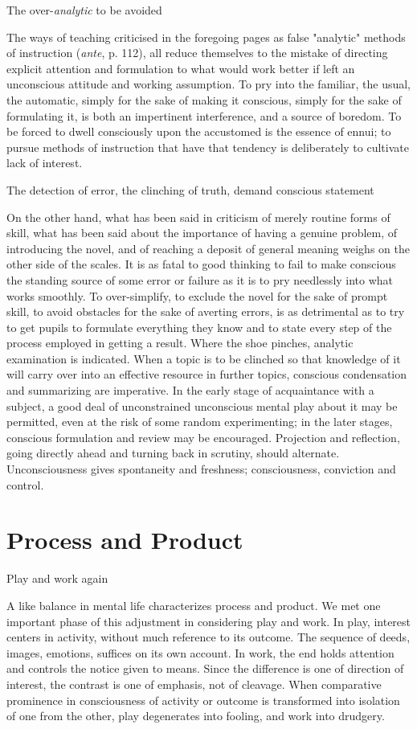 \documentclass[letterpaper]{book}
\begin{document}
The over-\emph{analytic} to be avoided

The ways of teaching criticised in the foregoing pages as false
"analytic" methods of instruction (\emph{ante}, p. 112), all reduce
themselves to the mistake of directing explicit attention and
formulation to what would work better if left an unconscious attitude
and working assumption. To pry into the familiar, the usual, the
automatic, simply for the sake of making it conscious, simply for the
sake of formulating it, is both an impertinent interference, and a
source of boredom. To be forced to dwell consciously upon the accustomed
is the essence of ennui; to pursue methods of instruction that have that
tendency is deliberately to cultivate lack of interest.

The detection of error, the clinching of truth, demand conscious
statement

On the other hand, what has been said in criticism of merely routine
forms of skill, what has been said about the importance of having a
genuine problem, of introducing the novel, and of reaching a deposit of
general meaning weighs on the other side of the scales. It is as fatal
to good thinking to fail to make conscious the standing source of some
error or failure as it is to pry needlessly into what works smoothly. To
over-simplify, to exclude the novel for the sake of prompt skill, to
avoid obstacles for the sake of averting errors, is as detrimental as to
try to get pupils to formulate everything they know and to state every
step of the process employed in getting a result. Where the shoe
pinches, analytic examination is indicated. When a topic is to be
clinched so that knowledge of it will carry over into an effective
resource in further topics, conscious condensation and summarizing are
imperative. In the early stage of acquaintance with a subject, a good
deal of unconstrained unconscious mental play about it may
be
permitted, even at the risk of some random experimenting; in the later
stages, conscious formulation and review may be encouraged. Projection
and reflection, going directly ahead and turning back in scrutiny,
should alternate. Unconsciousness gives spontaneity and freshness;
consciousness, conviction and control.

\section{Process and Product}

Play and work again

A like balance in mental life characterizes process and product. We met
one important phase of this adjustment in considering play and work. In
play, interest centers in activity, without much reference to its
outcome. The sequence of deeds, images, emotions, suffices on its own
account. In work, the end holds attention and controls the notice given
to means. Since the difference is one of direction of interest, the
contrast is one of emphasis, not of cleavage. When comparative
prominence in consciousness of activity or outcome is transformed into
isolation of one from the other, play degenerates into fooling, and work
into drudgery.
\end{document}
